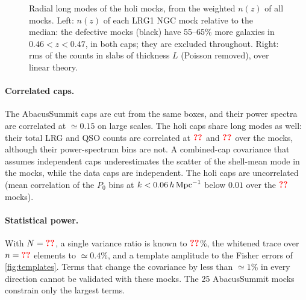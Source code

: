 \begin{figure}
  \centering{}
  \caption{Radial long modes of the holi mocks, from the weighted $n(z)$ of all mocks. Left: $n(z)$ of each LRG1 NGC mock relative to the median: the defective mocks (black) have 55--65\% more galaxies in $0.46<z<0.47$, in both caps; they are excluded throughout. Right: rms of the counts in slabs of thickness $L$ (Poisson removed), over linear theory.}
  \label{fig:nz}
\end{figure}

\paragraph{Correlated caps.} The AbacusSummit caps are cut from the same boxes, and their power spectra are correlated at $\simeq0.15$ on large scales. The holi caps share long modes as well: their total LRG and QSO counts are correlated at $\val{nzcapcorr/LRG1}$ and $\val{nzcapcorr/QSO}$ over the mocks, although their power-spectrum bins are not. A combined-cap covariance that assumes independent caps underestimates the scatter of the shell-mean mode in the mocks, while the data caps are independent. The holi caps are uncorrelated (mean correlation of the $P_0$ bins at $k<0.06\,h\,\mathrm{Mpc}^{-1}$ below $0.01$ over the $\val{Nmocks}$ mocks).

\paragraph{Statistical power.} With $N=\val{Nmocks}$, a single variance ratio is known to $\val{wishart}$\%, the whitened trace over $n=\val{nbins}$ elements to $\simeq0.4$\%, and a template amplitude to the Fisher errors of \cref{fig:templates}. Terms that change the covariance by less than $\simeq1$\% in every direction cannot be validated with these mocks. The 25 AbacusSummit mocks constrain only the largest terms.
